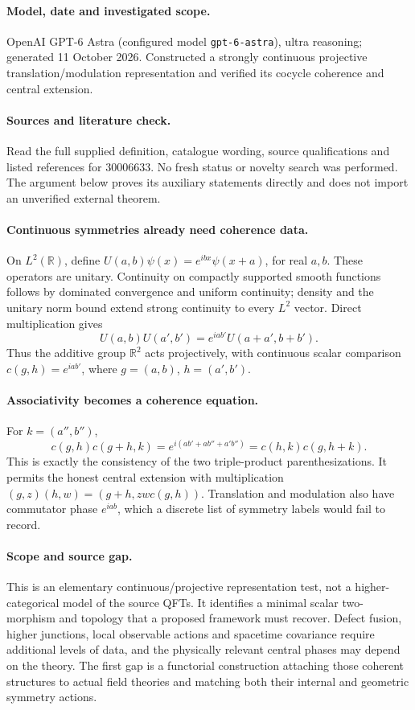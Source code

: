 \documentclass[11pt]{article}
\begin{document}
\paragraph{Model, date and investigated scope.}
OpenAI GPT-6 Astra (configured model \texttt{gpt-6-astra}), ultra reasoning; generated 11 October 2026. Constructed a strongly continuous projective translation/modulation representation and verified its cocycle coherence and central extension.

\paragraph{Sources and literature check.}
Read the full supplied definition, catalogue wording, source qualifications and listed references for 30006633. No fresh status or novelty search was performed. The argument below proves its auxiliary statements directly and does not import an unverified external theorem.

\paragraph{Continuous symmetries already need coherence data.} On \(L^2(\mathbb R)\), define \(U(a,b)\psi(x)=e^{ibx}\psi(x+a)\), for real \(a,b\). These operators are unitary. Continuity on compactly supported smooth functions follows by dominated convergence and uniform continuity; density and the unitary norm bound extend strong continuity to every \(L^2\) vector. Direct multiplication gives
\[
 U(a,b)U(a',b')=e^{iab'}U(a+a',b+b').
\]
Thus the additive group \(\mathbb R^2\) acts projectively, with continuous scalar comparison \(c(g,h)=e^{iab'}\), where \(g=(a,b)\), \(h=(a',b')\).
\paragraph{Associativity becomes a coherence equation.} For \(k=(a'',b'')\),
\[
 c(g,h)c(g+h,k)
 =e^{i(ab'+ab''+a'b'')}
 =c(h,k)c(g,h+k).
\]
This is exactly the consistency of the two triple-product parenthesizations. It permits the honest central extension with multiplication \((g,z)(h,w)=(g+h,zwc(g,h))\). Translation and modulation also have commutator phase \(e^{iab}\), which a discrete list of symmetry labels would fail to record.
\paragraph{Scope and source gap.} This is an elementary continuous/projective representation test, not a higher-categorical model of the source QFTs. It identifies a minimal scalar two-morphism and topology that a proposed framework must recover. Defect fusion, higher junctions, local observable actions and spacetime covariance require additional levels of data, and the physically relevant central phases may depend on the theory. The first gap is a functorial construction attaching those coherent structures to actual field theories and matching both their internal and geometric symmetry actions.
\end{document}
